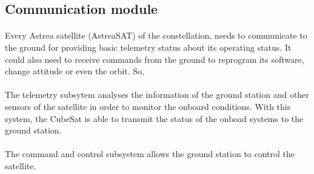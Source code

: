 \subsection{Communication module}


\paragraph{} Every Astrea satellite (AstreaSAT) of the constellation, needs to communicate to the ground for providing basic telemetry status about its operating status. It could also need to receive commands from the ground to reprogram its software, change attitude or even the orbit. So,  \\


\paragraph{} The telemetry subsytem analyses the information of the ground station and other sensors of the satellite in 	order to monitor the onboard conditions. With this system, the CubeSat is able to transmit the status of the onboad systems to the ground station.
\paragraph{}The command and control subsystem allows the ground station to control the satellite.